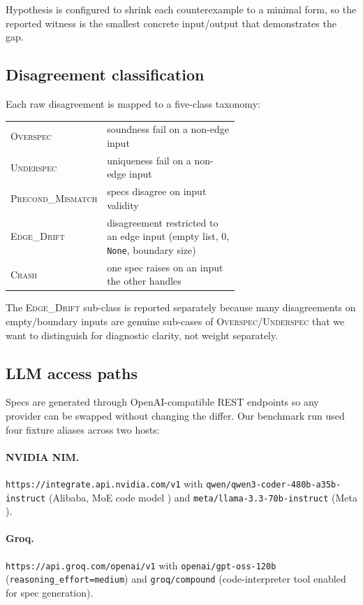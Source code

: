 \documentclass[11pt,a4paper]{article}
\begin{document}
Hypothesis is configured to shrink each counterexample to a minimal
form, so the reported witness is the smallest concrete input/output
that demonstrates the gap.

\subsection{Disagreement classification}

Each raw disagreement is mapped to a five-class taxonomy:

\begin{center}
\small
\begin{tabular}{lp{0.65\linewidth}}
\toprule
\textsc{Overspec} & soundness fail on a non-edge input \\
\textsc{Underspec} & uniqueness fail on a non-edge input \\
\textsc{Precond\_Mismatch} & specs disagree on input validity \\
\textsc{Edge\_Drift} & disagreement restricted to an edge input (empty list, $0$, \texttt{None}, boundary size) \\
\textsc{Crash} & one spec raises on an input the other handles \\
\bottomrule
\end{tabular}
\end{center}

The \textsc{Edge\_Drift} sub-class is reported separately because
many disagreements on empty/boundary inputs are genuine sub-cases of
\textsc{Overspec}/\textsc{Underspec} that we want to distinguish for
diagnostic clarity, not weight separately.

\subsection{LLM access paths}

Specs are generated through OpenAI-compatible REST endpoints so any
provider can be swapped without changing the differ. Our benchmark run
used four fixture aliases across two hosts:

\paragraph{NVIDIA NIM.}
\texttt{https://integrate.api.nvidia.com/v1} with
\texttt{qwen/qwen3-coder-480b-a35b-instruct} (Alibaba, MoE code model
\cite{qwen3coder}) and \texttt{meta/llama-3.3-70b-instruct} (Meta
\cite{llama33}).

\paragraph{Groq.}
\texttt{https://api.groq.com/openai/v1} with
\texttt{openai/gpt-oss-120b} (\texttt{reasoning\_effort=medium}) and
\texttt{groq/compound} (code-interpreter tool enabled for spec
generation).
\end{document}
